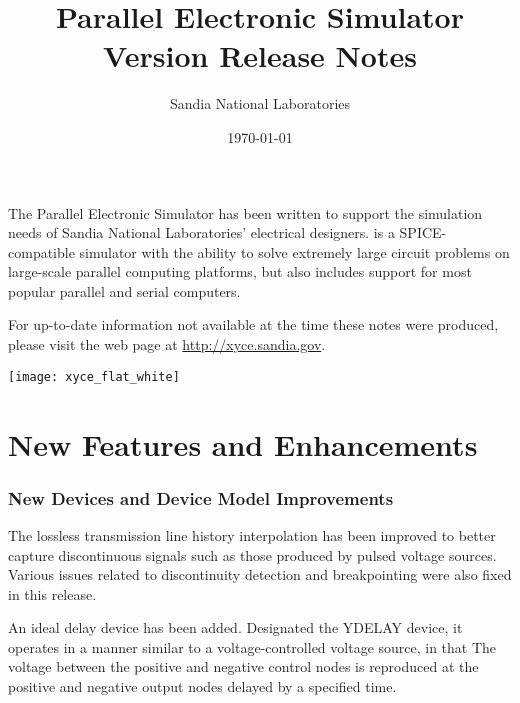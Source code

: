 \documentclass[letterpaper]{scrartcl}
\title{\XyceTitle{} Parallel Electronic Simulator\\
Version \XyceVersionVar{} Release Notes}
\author{ Sandia National Laboratories}
\date{\today}
\begin{document}
\maketitle

The \XyceTM{} Parallel Electronic Simulator has been written to support the
simulation needs of Sandia National Laboratories' electrical designers.
\XyceTM{} is a SPICE-compatible simulator with the ability to solve extremely
large circuit problems on large-scale parallel computing platforms, but also
includes support for most popular parallel and serial computers.

For up-to-date information not available at the time these notes were produced,
please visit the \XyceTM{} web page at
{\color{XyceDeepRed}\url{http://xyce.sandia.gov}}.

\tableofcontents
\vspace*{\fill}
\parbox{\textwidth}
{
  \hfill
  \texttt{[image: xyce\_flat\_white]}
}


\newpage
\section{New Features and Enhancements}

\subsubsection*{New Devices and Device Model Improvements}
\begin{XyceItemize}
  \item The lossless transmission line history interpolation has been
    improved to better capture discontinuous signals such as those
    produced by pulsed voltage sources.  Various issues related to
    discontinuity detection and breakpointing were also fixed in this
    release.
  \item An ideal delay device has been added. Designated the YDELAY device, it
    operates in a manner similar to a voltage-controlled voltage source, in
    that The voltage between the positive and negative control nodes is
    reproduced at the positive and negative output nodes delayed by a specified
    time.
\end{XyceItemize}
\end{document}
